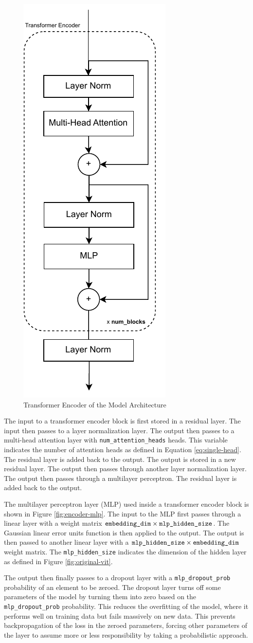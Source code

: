 \begin{figure}[H]
    \centering
    \includegraphics[width=0.2\linewidth]{images/TransformerEncoder.pdf}
    \caption{Transformer Encoder of the Model Architecture}
    \label{fig:transformer-encoder}
\end{figure}

The input to a transformer encoder block is first stored in a residual layer. The input then passes to a layer normalization layer. The output then passes to a multi-head attention layer with \verb|num_attention_heads| heads. This variable indicates the number of attention heads as defined in Equation \ref{eq:single-head}. The residual layer is added back to the output. The output is stored in a new residual layer. The output then passes through another layer normalization layer. The output then passes through a multilayer perceptron. The residual layer is added back to the output. 

The multilayer perceptron layer (MLP) used inside a transformer encoder block is shown in Figure \ref{fig:encoder-mlp}. The input to the MLP first passes through a linear layer with a weight matrix $\verb|embedding_dim| \times \verb|mlp_hidden_size|$. The Gaussian linear error units function is then applied to the output. The output is then passed to another linear layer with a $\verb|mlp_hidden_size| \times \verb|embedding_dim|$ weight matrix. The \verb|mlp_hidden_size| indicates the dimension of the hidden layer as defined in Figure \ref{fig:original-vit}.

The output then finally passes to a dropout layer with a \verb|mlp_dropout_prob| probability of an element to be zeroed. The dropout layer turns off some parameters of the model by turning them into zero based on the \verb|mlp_dropout_prob| probability. This reduces the overfitting of the model, where it performs well on training data but fails massively on new data. This prevents backpropagation of the loss in the zeroed parameters, forcing other parameters of the layer to assume more or less responsibility by taking a probabilistic approach. 

